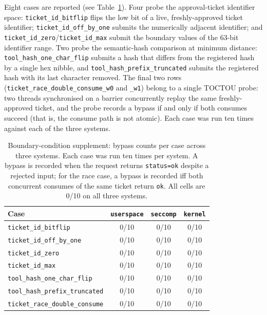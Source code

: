 Eight cases are reported (see Table~\ref{tab:boundary}). Four probe the approval-ticket identifier space: \texttt{ticket\_id\_bitflip} flips the low bit of a live, freshly-approved ticket identifier; \texttt{ticket\_id\_off\_by\_one} submits the numerically adjacent identifier; and \texttt{ticket\_id\_zero}/\texttt{ticket\_id\_max} submit the boundary values of the 63-bit identifier range. Two probe the semantic-hash comparison at minimum distance: \texttt{tool\_hash\_one\_char\_flip} submits a hash that differs from the registered hash by a single hex nibble, and \texttt{tool\_hash\_prefix\_truncated} submits the registered hash with its last character removed. The final two rows (\texttt{ticket\_race\_double\_consume\_w0} and \texttt{\_w1}) belong to a single TOCTOU probe: two threads synchronised on a barrier concurrently replay the same freshly-approved ticket, and the probe records a bypass if and only if both consumes succeed (that is, the consume path is not atomic). Each case was run ten times against each of the three systems.

\begin{table}[t]
\centering
\caption{Boundary-condition supplement: bypass counts per case across three systems. Each case was run ten times per system. A bypass is recorded when the request returns \texttt{status=ok} despite a rejected input; for the race case, a bypass is recorded iff both concurrent consumes of the same ticket return \texttt{ok}. All cells are 0/10 on all three systems.}
\label{tab:boundary}
\begin{tabular}{lccc}
\toprule
Case & \texttt{userspace} & \texttt{seccomp} & \texttt{kernel} \\
\midrule
\texttt{ticket\_id\_bitflip}           & 0/10 & 0/10 & 0/10 \\
\texttt{ticket\_id\_off\_by\_one}      & 0/10 & 0/10 & 0/10 \\
\texttt{ticket\_id\_zero}              & 0/10 & 0/10 & 0/10 \\
\texttt{ticket\_id\_max}               & 0/10 & 0/10 & 0/10 \\
\texttt{tool\_hash\_one\_char\_flip}   & 0/10 & 0/10 & 0/10 \\
\texttt{tool\_hash\_prefix\_truncated} & 0/10 & 0/10 & 0/10 \\
\texttt{ticket\_race\_double\_consume} & 0/10 & 0/10 & 0/10 \\
\bottomrule
\end{tabular}
\end{table}


